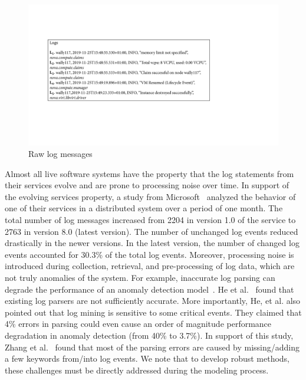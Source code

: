\begin{figure}[htbp]
\centerline{\includegraphics[width=1.0\textwidth]{gfx/chap2/log_lines.pdf}}
\caption{Raw log messages}
\label{fig:log_lines}
\end{figure}

Almost all live software systems have the property that the log statements from their services evolve and are prone to processing noise over time. In support of the evolving services property, a study from Microsoft~\cite{zhang2019robust} analyzed the behavior of one of their services in a distributed system over a period of one month. The total number of log messages increased from 2204 in version 1.0 of the service to 2763 in version 8.0 (latest version). The number of unchanged log events reduced drastically in the newer versions. In the latest version, the number of changed log events accounted for 30.3\% of the total log events. Moreover, processing noise is introduced during collection, retrieval, and pre-processing of log data, which are not truly anomalies of the system. For example, inaccurate log parsing can degrade the performance of an anomaly detection model~\cite{he2016evaluation}. He et al.~\cite{he2016evaluation} found that existing log parsers are not sufficiently accurate. More importantly, He, et al. also pointed out that log mining is sensitive to some critical events. They claimed that 4\% errors in parsing could even cause an order of magnitude performance degradation in anomaly detection (from 40\% to 3.7\%). In support of this study, Zhang et al.~\cite{zhang2019robust} found that most of the parsing errors are caused by missing/adding a few keywords from/into log events.  We note that to develop robust methods, these challenges must be directly addressed during the modeling process.


